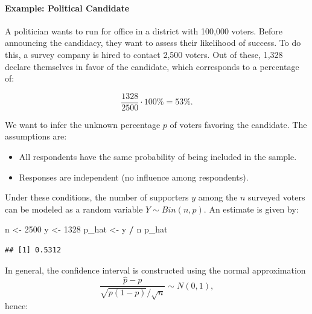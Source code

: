 \documentclass[
]{article}
\newenvironment{Shaded}{\begin{snugshade}}{\end{snugshade}}
\newcommand{\DecValTok}[1]{\textcolor[rgb]{0.00,0.00,0.81}{#1}}
\newcommand{\NormalTok}[1]{#1}
\newcommand{\OtherTok}[1]{\textcolor[rgb]{0.56,0.35,0.01}{#1}}
\newcommand{\SpecialCharTok}[1]{\textcolor[rgb]{0.81,0.36,0.00}{\textbf{#1}}}
\providecommand{\tightlist}{%
  \setlength{\itemsep}{0pt}\setlength{\parskip}{0pt}}
\begin{document}
\hypertarget{example-political-candidate}{%
\paragraph{Example: Political
Candidate}\label{example-political-candidate}}

A politician wants to run for office in a district with 100,000 voters.
Before announcing the candidacy, they want to assess their likelihood of
success. To do this, a survey company is hired to contact 2,500 voters.
Out of these, 1,328 declare themselves in favor of the candidate, which
corresponds to a percentage of:

\[
\frac{1328}{2500} \cdot 100\% = 53\%.
\]

We want to infer the unknown percentage \(p\) of voters favoring the
candidate. The assumptions are:

\begin{itemize}
\tightlist
\item
  All respondents have the same probability of being included in the
  sample.
\item
  Responses are independent (no influence among respondents).
\end{itemize}

Under these conditions, the number of supporters \(y\) among the \(n\)
surveyed voters can be modeled as a random variable
\(Y \sim Bin(n, p)\). An estimate is given by:

\begin{Shaded}
\begin{Highlighting}[]
\NormalTok{n }\OtherTok{\textless{}{-}} \DecValTok{2500}
\NormalTok{y }\OtherTok{\textless{}{-}} \DecValTok{1328}
\NormalTok{p\_hat }\OtherTok{\textless{}{-}}\NormalTok{ y }\SpecialCharTok{/}\NormalTok{ n}
\NormalTok{p\_hat}
\end{Highlighting}
\end{Shaded}

\begin{verbatim}
## [1] 0.5312
\end{verbatim}

In general, the confidence interval is constructed using the normal
approximation \[\frac{\hat{p}-p}{\sqrt{p(1-p)}/\sqrt{n}} \sim N(0,1),\]
hence:
\end{document}
